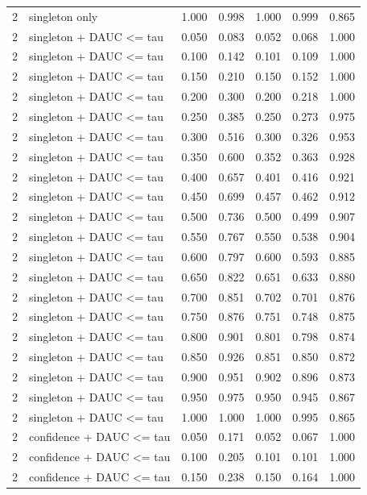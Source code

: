 \begin{tabular}{rlrrrrr}
2 & singleton only & 1.000 & 0.998 & 1.000 & 0.999 & 0.865 \\
2 & singleton + DAUC <= tau & 0.050 & 0.083 & 0.052 & 0.068 & 1.000 \\
2 & singleton + DAUC <= tau & 0.100 & 0.142 & 0.101 & 0.109 & 1.000 \\
2 & singleton + DAUC <= tau & 0.150 & 0.210 & 0.150 & 0.152 & 1.000 \\
2 & singleton + DAUC <= tau & 0.200 & 0.300 & 0.200 & 0.218 & 1.000 \\
2 & singleton + DAUC <= tau & 0.250 & 0.385 & 0.250 & 0.273 & 0.975 \\
2 & singleton + DAUC <= tau & 0.300 & 0.516 & 0.300 & 0.326 & 0.953 \\
2 & singleton + DAUC <= tau & 0.350 & 0.600 & 0.352 & 0.363 & 0.928 \\
2 & singleton + DAUC <= tau & 0.400 & 0.657 & 0.401 & 0.416 & 0.921 \\
2 & singleton + DAUC <= tau & 0.450 & 0.699 & 0.457 & 0.462 & 0.912 \\
2 & singleton + DAUC <= tau & 0.500 & 0.736 & 0.500 & 0.499 & 0.907 \\
2 & singleton + DAUC <= tau & 0.550 & 0.767 & 0.550 & 0.538 & 0.904 \\
2 & singleton + DAUC <= tau & 0.600 & 0.797 & 0.600 & 0.593 & 0.885 \\
2 & singleton + DAUC <= tau & 0.650 & 0.822 & 0.651 & 0.633 & 0.880 \\
2 & singleton + DAUC <= tau & 0.700 & 0.851 & 0.702 & 0.701 & 0.876 \\
2 & singleton + DAUC <= tau & 0.750 & 0.876 & 0.751 & 0.748 & 0.875 \\
2 & singleton + DAUC <= tau & 0.800 & 0.901 & 0.801 & 0.798 & 0.874 \\
2 & singleton + DAUC <= tau & 0.850 & 0.926 & 0.851 & 0.850 & 0.872 \\
2 & singleton + DAUC <= tau & 0.900 & 0.951 & 0.902 & 0.896 & 0.873 \\
2 & singleton + DAUC <= tau & 0.950 & 0.975 & 0.950 & 0.945 & 0.867 \\
2 & singleton + DAUC <= tau & 1.000 & 1.000 & 1.000 & 0.995 & 0.865 \\
2 & confidence + DAUC <= tau & 0.050 & 0.171 & 0.052 & 0.067 & 1.000 \\
2 & confidence + DAUC <= tau & 0.100 & 0.205 & 0.101 & 0.101 & 1.000 \\
2 & confidence + DAUC <= tau & 0.150 & 0.238 & 0.150 & 0.164 & 1.000 \\

\end{tabular}
